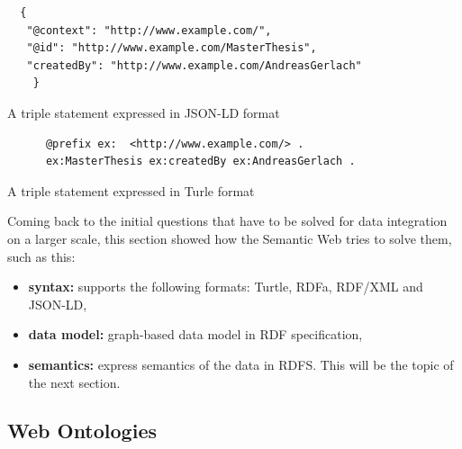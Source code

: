 \begin{listing}[H]
	\begin{verbatim}
  {
   "@context": "http://www.example.com/",
   "@id": "http://www.example.com/MasterThesis",
   "createdBy": "http://www.example.com/AndreasGerlach"
 	}
	\end{verbatim}
\caption{A triple statement expressed in \gls{JSON-LD} format}
\label{lst:jsonld_meta_data}
\end{listing}

\begin{listing}[H]
	\begin{verbatim}
	  @prefix ex:  <http://www.example.com/> .
	  ex:MasterThesis ex:createdBy ex:AndreasGerlach .
	\end{verbatim}
\caption{A triple statement expressed in Turle format}
\label{lst:turtle_meta_data}
\end{listing}

Coming back to the initial questions that have to be solved for data integration on a larger scale, this section showed how the Semantic Web tries to solve them, such as this: \@

\begin{itemize}
	\item \textbf{syntax:} supports the following formats: Turtle, \gls{RDFa}, \gls{RDF}/\gls{XML} and \gls{JSON-LD},
	\item \textbf{data model:} graph-based data model in \gls{RDF} specification,
	\item \textbf{semantics:} express semantics of the data in \gls{RDFS}. This will be the topic of the next section.
\end{itemize}


\subsection{Web Ontologies}
\label{sec:semantic_ontologies}

